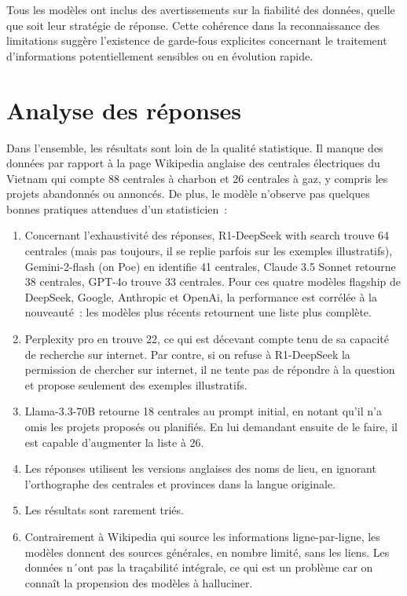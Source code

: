 \documentclass[a4paper,11pt]{report}
\providecommand{\tightlist}{\setlength{\itemsep}{0pt}\setlength{\parskip}{0pt}}
\begin{document}
Tous les modèles ont inclus des avertissements sur la fiabilité des données, quelle que soit leur stratégie de réponse. Cette cohérence dans la reconnaissance des limitations suggère l'existence de garde-fous explicites concernant le traitement d'informations potentiellement sensibles ou en évolution rapide.

\section{Analyse des réponses}\label{analyse-des-ruxe9ponses}

Dans l'ensemble, les résultats sont loin de la qualité statistique. Il manque des données par rapport à la page Wikipedia anglaise des centrales électriques du Vietnam \citep{TQ8TFB8H} qui compte 88 centrales à charbon et 26 centrales à gaz, y compris les projets abandonnés ou annoncés. De plus, le modèle n'observe pas quelques bonnes pratiques attendues d'un statisticien~:

\begin{enumerate}
\def\labelenumi{\roman{enumi}.}
\tightlist
\item
  Concernant l'exhaustivité des réponses, R1-DeepSeek with search trouve 64 centrales (mais pas toujours, il se replie parfois sur les exemples illustratifs), Gemini-2-flash (on Poe) en identifie 41 centrales, Claude 3.5 Sonnet retourne 38 centrales, GPT-4o trouve 33 centrales. Pour ces quatre modèles flagship de DeepSeek, Google, Anthropic et OpenAi, la performance est corrélée à la nouveauté~: les modèles plus récents retournent une liste plus complète.
\item
  Perplexity pro en trouve 22, ce qui est décevant compte tenu de sa capacité de recherche sur internet. Par contre, si on refuse à R1-DeepSeek la permission de chercher sur internet, il ne tente pas de répondre à la question et propose seulement des exemples illustratifs.
\item
  Llama-3.3-70B retourne 18 centrales au prompt initial, en notant qu'il n'a omis les projets proposés ou planifiés. En lui demandant ensuite de le faire, il est capable d'augmenter la liste à 26.
\item
  Les réponses utilisent les versions anglaises des noms de lieu, en ignorant l'orthographe des centrales et provinces dans la langue originale.
\item
  Les résultats sont rarement triés.
\item
  Contrairement à Wikipedia qui source les informations ligne-par-ligne, les modèles donnent des sources générales, en nombre limité, sans les liens. Les données n´ont pas la traçabilité intégrale, ce qui est un problème car on connaît la propension des modèles à halluciner.
\end{enumerate}
\end{document}
